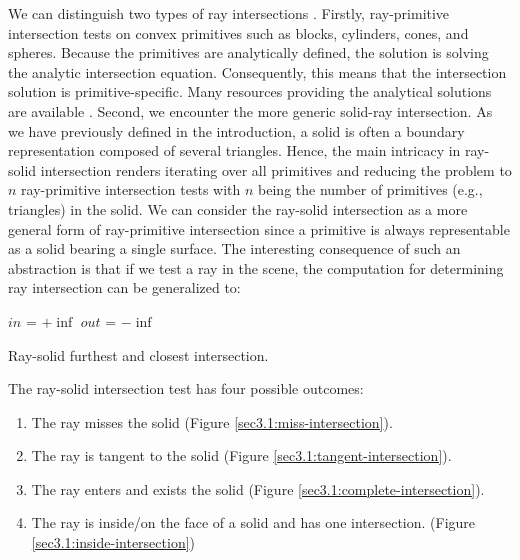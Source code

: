 \documentclass[a4paper,11pt,oneside]{article}
\begin{document}
We can distinguish two types of ray intersections \cite{rasterization_scratch_pixel}. Firstly, ray-primitive intersection tests on convex primitives such as blocks, cylinders, cones, and spheres. Because the primitives are analytically defined, the solution is solving the analytic intersection equation. Consequently, this means that the intersection solution is primitive-specific. Many resources providing the analytical solutions are available \cite{ray_primitive_intersections}.
Second, we encounter the more generic solid-ray intersection. As we have previously defined in the introduction, a solid is often a boundary representation composed of several triangles. Hence, the main intricacy in ray-solid intersection renders iterating over all primitives and reducing the problem to $n$ ray-primitive intersection tests with $n$ being the number of primitives (e.g., triangles) in the solid.
We can consider the ray-solid intersection as a more general form of ray-primitive intersection since a primitive is always representable as a solid bearing a single surface. The interesting consequence of such an abstraction is that if we test a ray in the scene, the computation for determining ray intersection can be generalized to:

\begin{algorithm}[H]
	\SetAlgoLined
	$in$ = $+\inf$\;
	$out$ = $-\inf$\;
	\caption{Ray-solid furthest and closest intersection.}
\end{algorithm}

The ray-solid intersection test has four possible outcomes:
\begin{enumerate}
	\item The ray misses the solid (Figure \ref{sec3.1:miss-intersection}).
	\item The ray is tangent to the solid (Figure \ref{sec3.1:tangent-intersection}).
	\item The ray enters and exists the solid (Figure \ref{sec3.1:complete-intersection}).
	\item The ray is inside/on the face of a solid and has one intersection. (Figure \ref{sec3.1:inside-intersection})
\end{enumerate}
\end{document}
